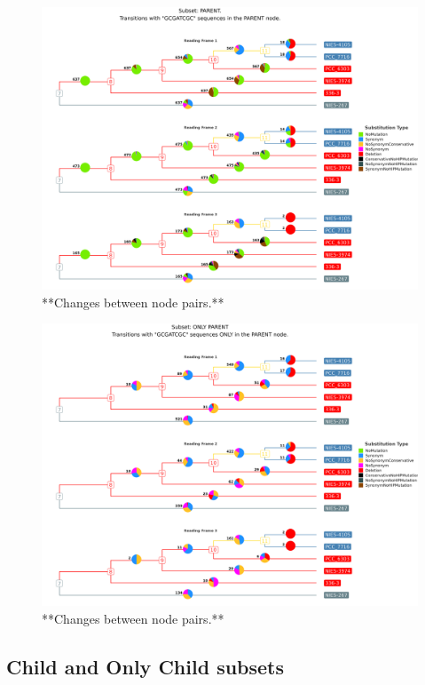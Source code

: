 \documentclass[
]{book}
\begin{document}
\begin{figure}
\includegraphics[width=1\linewidth]{figures/ALL_SITES_Ancestor_codon_mutations_tree} \caption{**Changes between node pairs.**}\label{fig:FIG11x}
\end{figure}
\begin{figure}
\includegraphics[width=1\linewidth]{figures/ALL_SITES_AncestorO_codon_mutations_tree} \caption{**Changes between node pairs.**}\label{fig:FIG12x}
\end{figure}

\hypertarget{child-and-only-child-subsets}{%
\subsection{Child and Only Child subsets}\label{child-and-only-child-subsets}}
\end{document}
